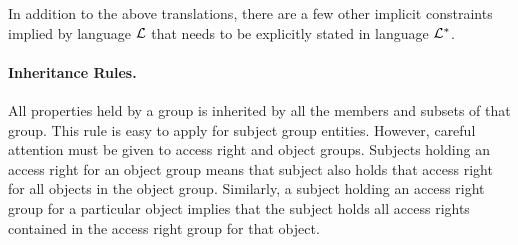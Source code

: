 \documentclass[10pt, twocolumn]{article}
\begin{document}
        In addition to the above translations, there are a few other implicit
        constraints implied by language ${\cal L}$ that needs to be explicitly
        stated in language ${\cal L}^{*}$.

        \paragraph{Inheritance Rules.}

          All properties held by a group is inherited by all the members and
          subsets of that group. This rule is easy to apply for subject group
          entities. However, careful attention must be given to access right
          and object groups. Subjects holding an access right for an object
          group means that subject also holds that access right for all objects
          in the object group. Similarly, a subject holding an access right
          group for a particular object implies that the subject holds
          all access rights contained in the access right group for that
          object.
\end{document}
